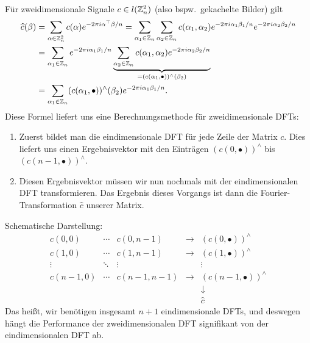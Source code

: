 \begin{remark}
Für zweidimensionale Signale $ c \in l(\mathbb{Z}_{n}^{2}) $ (also bspw.\ gekachelte Bilder) gilt
\begin{align*}
     \widehat{c}(\beta)
  &= \sum_{\alpha \in \mathbb{Z}_{n}^{2}} c(\alpha) e^{-2\pi i \alpha^{\top} \beta / n}
   = \sum_{\alpha_{1} \in \mathbb{Z}_{n}} \sum_{\alpha_{2} \in \mathbb{Z}_{n}}
       c(\alpha_{1}, \alpha_{2}) e^{-2 \pi i \alpha_{1} \beta_{1} / n} 
       e^{-2 \pi i \alpha_{2} \beta_{2} / n} \\
  &= \sum_{\alpha_{1} \in \mathbb{Z}_{n}} e^{-2 \pi i \alpha_{1} \beta_{1} / n}
        \underbrace{\sum_{\alpha_{2} \in \mathbb{Z}_{n}} c(\alpha_{1}, \alpha_{2}) 
          e^{-2 \pi i \alpha_{2} \beta_{2} / n}}_{
            = (c(\alpha_{1}, \bullet))^{\wedge}(\beta_{2})} \\
  &= \sum_{\alpha_{1} \in \mathbb{Z}_{n}} (c(\alpha_{1}, \bullet))^{\wedge}(\beta_{2})
        e^{-2 \pi i \alpha_{1} \beta_{1} / n}.
\end{align*}
Diese Formel liefert uns eine Berechnungsmethode für zweidimensionale DFTs:
\begin{enumerate}
\item Zuerst bildet man die eindimensionale DFT für jede Zeile der Matrix $ c $. Dies liefert uns
  einen Ergebnisvektor mit den Einträgen $ (c(0, \bullet))^{\wedge} $ bis
  $ (c(n - 1, \bullet))^{\wedge} $.
\item Diesen Ergebnisvektor müssen wir nun nochmals mit der eindimensionalen DFT transformieren.
  Das Ergebnis dieses Vorgangs ist dann die Fourier-Transformation $ \widehat{c} $ unserer Matrix.
\end{enumerate}
Schematische Darstellung:
\[
  \begin{array}{ccccc}
    c(0,0) & \cdots & c(0, n -1) & \rightarrow & (c(0, \bullet))^{\wedge} \\
    c(1,0) & \cdots & c(1, n -1) & \rightarrow & (c(1, \bullet))^{\wedge} \\
    \vdots & \ddots & \vdots	   &   					 & \vdots \\
    c(n - 1, 0) & \cdots & c(n - 1, n -1) & \rightarrow & (c(n - 1, \bullet))^{\wedge} \\
    & & & & \downarrow \\
    & & & & \widehat{c}
  \end{array}
\]
Das heißt, wir benötigen insgesamt $ n + 1 $ eindimensionale DFTs, und deswegen hängt die
Performance der zweidimensionalen DFT signifikant von der eindimensionalen DFT ab.
\end{remark}

